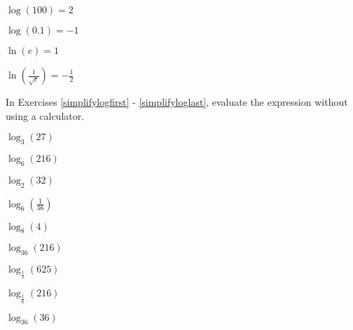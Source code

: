 \documentclass{ximera}
\begin{document}
\begin{question}
\begin{problem}
$\log(100) = 2$ 
\end{problem}

\begin{problem}
$\log (0.1) = -1$
\end{problem}

\begin{problem}
$\ln(e) = 1$ 
\end{problem}

\begin{problem}\label{rewritelastex}
$\ln\left(\frac{1}{\sqrt{e}}\right) = -\frac{1}{2}$   
\end{problem}

\end{question}

\begin{question}
In Exercises \ref{simplifylogfirst} - \ref{simplifyloglast}, evaluate the expression without using a calculator.

\begin{problem}\label{simplifylogfirst}
$\log_{3} (27)$
\end{problem}

\begin{problem}
$\log_{6} (216)$
\end{problem}

\begin{problem}
$\log_{2} (32)$
\end{problem}

\begin{problem}
$\log_{6} \left( \frac{1}{36} \right)$
\end{problem}

\begin{problem}
$\log_{8} (4)$
\end{problem}

\begin{problem}
$\log_{36} (216)$
\end{problem}

\begin{problem}
$\log_{\frac{1}{5}} (625)$
\end{problem}

\begin{problem}
$\log_{\frac{1}{6}} (216)$
\end{problem}

\begin{problem}
$\log_{36} (36)$
\end{problem}


\end{question}
\end{document}
